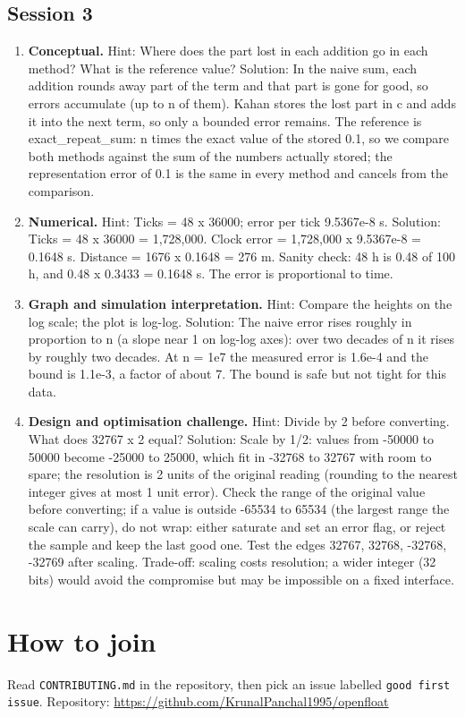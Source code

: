 \documentclass[11pt,a4paper]{article}
\begin{document}
\subsection*{Session 3}
\begin{enumerate}[nosep]
\item \textbf{Conceptual.} Hint: Where does the part lost in each addition go in each method? What is the reference value? Solution: In the naive sum, each addition rounds away part of the term and that part is gone for good, so errors accumulate (up to n of them). Kahan stores the lost part in c and adds it into the next term, so only a bounded error remains. The reference is exact\_repeat\_sum: n times the exact value of the stored 0.1, so we compare both methods against the sum of the numbers actually stored; the representation error of 0.1 is the same in every method and cancels from the comparison.
\item \textbf{Numerical.} Hint: Ticks = 48 x 36000; error per tick 9.5367e-8 s. Solution: Ticks = 48 x 36000 = 1,728,000. Clock error = 1,728,000 x 9.5367e-8 = 0.1648 s. Distance = 1676 x 0.1648 = 276 m. Sanity check: 48 h is 0.48 of 100 h, and 0.48 x 0.3433 = 0.1648 s. The error is proportional to time.
\item \textbf{Graph and simulation interpretation.} Hint: Compare the heights on the log scale; the plot is log-log. Solution: The naive error rises roughly in proportion to n (a slope near 1 on log-log axes): over two decades of n it rises by roughly two decades. At n = 1e7 the measured error is 1.6e-4 and the bound is 1.1e-3, a factor of about 7. The bound is safe but not tight for this data.
\item \textbf{Design and optimisation challenge.} Hint: Divide by 2 before converting. What does 32767 x 2 equal? Solution: Scale by 1/2: values from -50000 to 50000 become -25000 to 25000, which fit in -32768 to 32767 with room to spare; the resolution is 2 units of the original reading (rounding to the nearest integer gives at most 1 unit error). Check the range of the original value before converting; if a value is outside -65534 to 65534 (the largest range the scale can carry), do not wrap: either saturate and set an error flag, or reject the sample and keep the last good one. Test the edges 32767, 32768, -32768, -32769 after scaling. Trade-off: scaling costs resolution; a wider integer (32 bits) would avoid the compromise but may be impossible on a fixed interface.
\end{enumerate}

\section{How to join}
Read \texttt{CONTRIBUTING.md} in the repository, then pick an issue labelled \texttt{good first issue}. Repository: \url{https://github.com/KrunalPanchal1995/openfloat}
\end{document}
